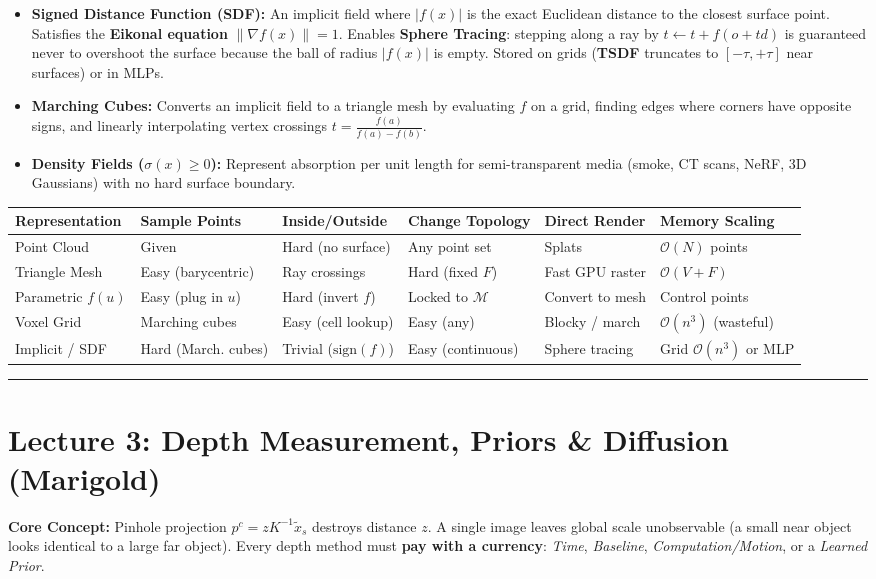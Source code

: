 \documentclass[10pt, a4paper]{article}
\newcommand{\hr}{\vspace{0.8em}\hrule\vspace{0.8em}}
\begin{document}
\begin{itemize}
\begin{itemize}
        \item \textbf{Signed Distance Function (SDF):} An implicit field where $|f(x)|$ is the exact Euclidean distance to the closest surface point. Satisfies the \textbf{Eikonal equation} $\|\nabla f(x)\| = 1$. Enables \textbf{Sphere Tracing}: stepping along a ray by $t \leftarrow t + f(o+td)$ is guaranteed never to overshoot the surface because the ball of radius $|f(x)|$ is empty. Stored on grids (\textbf{TSDF} truncates to $[-\tau, +\tau]$ near surfaces) or in MLPs.
        \item \textbf{Marching Cubes:} Converts an implicit field to a triangle mesh by evaluating $f$ on a grid, finding edges where corners have opposite signs, and linearly interpolating vertex crossings $t = \frac{f(a)}{f(a)-f(b)}$.
        \item \textbf{Density Fields ($\sigma(x) \ge 0$):} Represent absorption per unit length for semi-transparent media (smoke, CT scans, NeRF, 3D Gaussians) with no hard surface boundary.
    \end{itemize}
\end{itemize}

\begin{table}[h!]
\centering
\small
{}
\begin{tabularx}{\textwidth}{l Y Y Y Y Y}
\toprule
\textbf{Representation} & \textbf{Sample Points} & \textbf{Inside/Outside} & \textbf{Change Topology} & \textbf{Direct Render} & \textbf{Memory Scaling} \\
\midrule
Point Cloud & Given & Hard (no surface) & Any point set & Splats & $\mathcal{O}(N)$ points \\
Triangle Mesh & Easy (barycentric) & Ray crossings & Hard (fixed $F$) & Fast GPU raster & $\mathcal{O}(V + F)$ \\
Parametric $f(u)$ & Easy (plug in $u$) & Hard (invert $f$) & Locked to $\mathcal{M}$ & Convert to mesh & Control points \\
Voxel Grid & Marching cubes & Easy (cell lookup) & Easy (any) & Blocky / march & $\mathcal{O}(n^3)$ (wasteful) \\
Implicit / SDF & Hard (March. cubes) & Trivial ($\text{sign}(f)$) & Easy (continuous) & Sphere tracing & Grid $\mathcal{O}(n^3)$ or MLP \\
\bottomrule
\end{tabularx}
\end{table}

\hr
\section*{\textcolor{primary}{Lecture 3: Depth Measurement, Priors \& Diffusion (Marigold)}}
\textbf{Core Concept:} Pinhole projection $p^c = z K^{-1}\tilde{x}_s$ destroys distance $z$. A single image leaves global scale unobservable (a small near object looks identical to a large far object). Every depth method must \textbf{pay with a currency}: \emph{Time}, \emph{Baseline}, \emph{Computation/Motion}, or a \emph{Learned Prior}.
\end{document}
